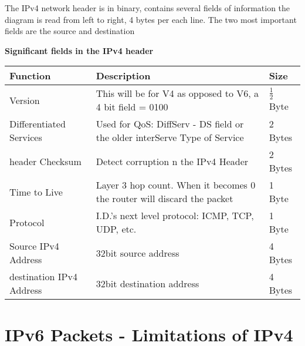 \documentclass{article}
\begin{document}
\begin{flushleft}
    The IPv4 network header is in binary, contains several fields of information
    the diagram is read from left to right, 4 bytes per each line. The two most important fields
    are the source and destination

    \textbf{Significant fields in the IPv4 header}

    \begin{center}
        \begin{tabular}{ |m{5cm}|m{5cm}|m{2cm}|}
            \hline

            Function & Description & Size \\

            \hline

            Version & This will be for V4 as opposed to V6, a 4 bit field = 0100 & $\frac{1}{2}$ Byte\\
            \hline

            Differentiated Services & Used for QoS: DiffServ - DS field or the older interServe Type of Service & 2 Bytes\\
            \hline

            header Checksum & Detect corruption n the IPv4 Header & 2 Bytes\\
            \hline

            Time to Live & Layer 3 hop count. When it becomes 0 the router will discard the packet & 1 Byte\\
            \hline

            Protocol & I.D.'s next level protocol: ICMP, TCP, UDP, etc. & 1 Byte\\
            \hline

            Source IPv4 Address & 32bit source address & 4 Bytes\\
            \hline

            destination IPv4 Address & 32bit destination address & 4 Bytes\\
            \hline
        \end{tabular}
    \end{center}
\end{flushleft}

\section{\textbf{IPv6 Packets - Limitations of IPv4}}
\end{document}
